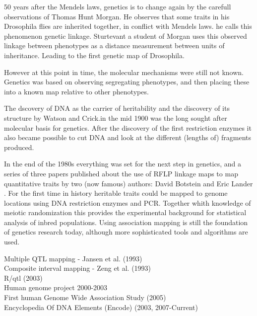 50 years after the Mendels laws, genetics is to change again by the carefull observations of 
Thomas Hunt Morgan. He observes that some traits in his Drosophila flies are inherited together, 
in conflict with Mendels laws. he calls this phenomenon genetic linkage. Sturtevant a student 
of Morgan uses this observed linkage between phenotypes as a distance measurement between 
units of inheritance. Leading to the first genetic map of Drosophila.

However at this point in time, the molecular mechanisms were still not known. Genetics was based 
on observing segregating phenotypes, and then placing these into a known map relative to other 
phenotypes. 


The dscovery of DNA as the carrier of heritability and the discovery of its structure by Watson 
and Crick.in the mid 1900 was the long sought after molecular basis for genetics. After the 
discovery of the first restriction enzymes it also became possible to cut DNA and look at the 
different (lengths of) fragments produced.

In the end of the 1980s everything was set for the next step in genetics, and 
a series of three papers published about the use of RFLP linkage maps to map quantitative 
traits by two (now famous) authors: David Botstein and Eric Lander 
\cite{Lander:1986, Lander:1987, Lander:1989}. For the first time in history heritable traits 
could be mapped to genome locations using DNA restriction enzymes and PCR. Together whith knowledge 
of meiotic randomization this provides the experimental background for statistical analysis 
of inbred populations. Using association mapping is still the foundation of genetics research 
today, although more sophisticated tools and algorithms are used.

Multiple QTL mapping - Jansen et al. (1993)\\
Composite interval mapping -  Zeng et al. (1993)\\
R/qtl (2003)\\
Human genome project 2000-2003\\
First human Genome Wide Association Study (2005)\\
Encyclopedia Of DNA Elements (Encode) (2003, 2007-Current)


